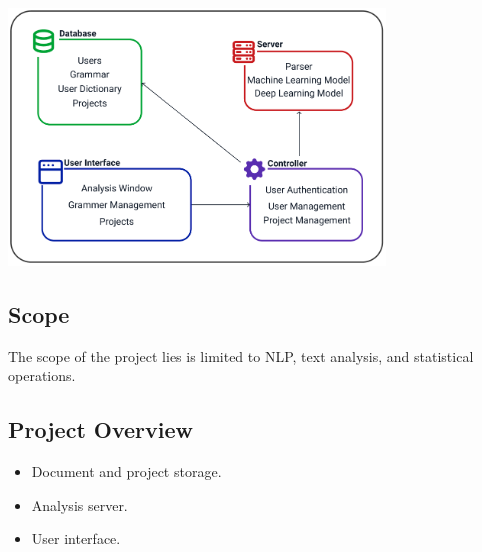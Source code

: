 \includegraphics[width=10cm]{images/System Overview.png}

\subsection{Scope}
The scope of the project lies is limited to NLP, text analysis, and statistical operations.

\subsection{Project Overview}
\begin{itemize}
  \item Document and project storage.
  \item Analysis server.
  \item User interface.
\end{itemize}
